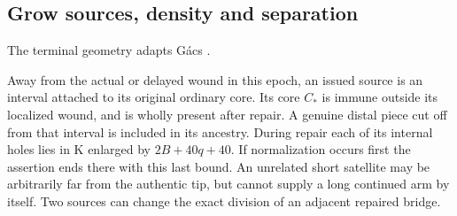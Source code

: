 \subsection{Grow sources, density and separation}
The terminal geometry adapts G\'acs \cite[Section~15]{gacs86}.
\begin{lemma}\label{lem:attachment}
Away from the actual or delayed wound in this epoch, an issued source is an interval attached to its original ordinary core. Its core \(C_*\) is immune outside its localized wound, and is wholly present after repair. A genuine distal piece cut off from that interval is included in its ancestry. During repair each of its internal holes lies in K enlarged by \(2B+40q+40\). If normalization occurs first the assertion ends there with this last bound. An unrelated short satellite may be arbitrarily far from the authentic tip, but cannot supply a long continued arm by itself. Two sources can change the exact division of an adjacent repaired bridge.
\end{lemma}
